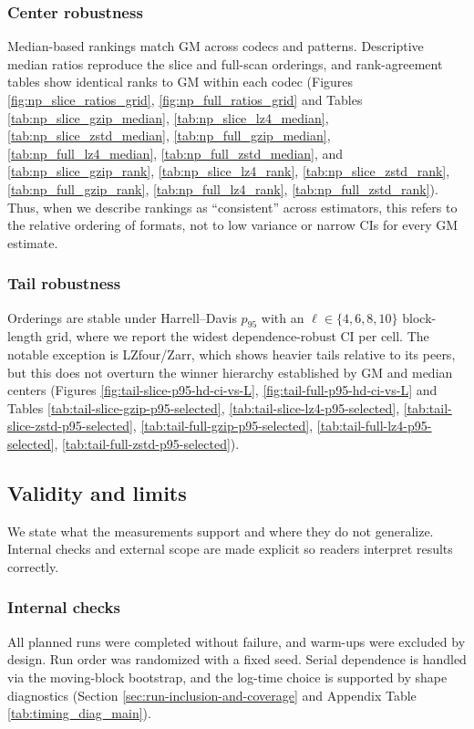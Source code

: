\documentclass[nomenclature, english, bibtex]{kththesis}
\numberwithin{listing}{chapter}
\begin{document}
\subsubsection{Center robustness}
Median-based rankings match \gls{GM} across codecs and patterns. Descriptive median ratios reproduce the slice and full-scan orderings, and rank-agreement tables show identical ranks to \gls{GM} within each codec (Figures \ref{fig:np_slice_ratios_grid}, \ref{fig:np_full_ratios_grid} and Tables \ref{tab:np_slice_gzip_median}, \ref{tab:np_slice_lz4_median}, \ref{tab:np_slice_zstd_median}, \ref{tab:np_full_gzip_median}, \ref{tab:np_full_lz4_median}, \ref{tab:np_full_zstd_median}, and \ref{tab:np_slice_gzip_rank}, \ref{tab:np_slice_lz4_rank}, \ref{tab:np_slice_zstd_rank}, \ref{tab:np_full_gzip_rank}, \ref{tab:np_full_lz4_rank}, \ref{tab:np_full_zstd_rank}). Thus, when we describe rankings as “consistent” across estimators, this refers to the relative ordering of formats, not to low variance or narrow CIs for every \gls{GM} estimate.

\subsubsection{Tail robustness}
Orderings are stable under Harrell–Davis $p_{95}$ with an $\ell\in\{4,6,8,10\}$ block-length grid, where we report the widest dependence-robust \gls{CI} per cell. The notable exception is \gls{LZfour}/Zarr, which shows heavier tails relative to its peers, but this does not overturn the winner hierarchy established by \gls{GM} and median centers (Figures \ref{fig:tail-slice-p95-hd-ci-vs-L}, \ref{fig:tail-full-p95-hd-ci-vs-L} and Tables \ref{tab:tail-slice-gzip-p95-selected}, \ref{tab:tail-slice-lz4-p95-selected}, \ref{tab:tail-slice-zstd-p95-selected}, \ref{tab:tail-full-gzip-p95-selected}, \ref{tab:tail-full-lz4-p95-selected}, \ref{tab:tail-full-zstd-p95-selected}).

\subsection{Validity and limits}
We state what the measurements support and where they do not generalize. Internal checks and external scope are made explicit so readers interpret results correctly.

\subsubsection{Internal checks}
All planned runs were completed without failure, and warm-ups were excluded by design. Run order was randomized with a fixed seed. Serial dependence is handled via the moving-block bootstrap, and the log-time choice is supported by shape diagnostics (Section \ref{sec:run-inclusion-and-coverage} and Appendix Table \ref{tab:timing_diag_main}).
\end{document}
